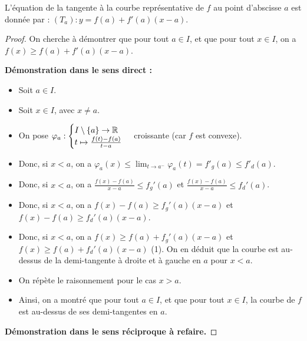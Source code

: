 \documentclass[12pt, a4paper]{report}
\begin{document}
\begin{remark}
  L'équation de la tangente à la courbe représentative de $f$ au point d'abscisse $a$ est donnée par : $(T_a):y = f(a) + f'(a)(x-a)$.
\end{remark}

\begin{proof}
  On cherche à démontrer que pour tout $a \in I$, et que pour tout $x \in I$, on a $f(x) \ge f(a) + f'(a)(x-a)$.

  \textbf{Démonstration dans le sens direct :}

  \begin{itemize}
    \item Soit $a \in I$.
    \item Soit $x \in I$, avec $x \ne a$.
    \item On pose $\varphi_a : \begin{cases} I\setminus\{a\}\to\mathbb{R} \\ t\mapsto \frac{f(t)-f(a)}{t-a} \end{cases}$ croissante (car $f$ est convexe).
    \item Donc, si $x<a$, on a $\varphi_a(x) \le \lim_{t\to a^-}\varphi_a(t) = f'_g(a) \le f'_d(a)$.
    \item Donc, si $x<a$, on a $\frac{f(x)-f(a)}{x-a} \le f_g'(a)$ et $\frac{f(x)-f(a)}{x-a} \le f_d'(a)$.
    \item Donc, si $x<a$, on a $f(x) - f(a) \ge f_g'(a)(x-a)$ et $f(x) - f(a) \ge f_d'(a)(x-a)$.
    \item Donc, si $x<a$, on a $f(x) \ge f(a) + f_g'(a)(x-a)$ et $f(x) \ge f(a) + f_d'(a)(x-a)$ (1). On en déduit que la courbe est au-dessus de la demi-tangente à droite et à gauche en $a$ pour $x<a$.
    \item On répète le raisonnement pour le cas $x>a$.
    \item Ainsi, on a montré que pour tout $a \in I$, et que pour tout $x \in I$, la courbe de $f$ est au-dessus de ses demi-tangentes en $a$.
  \end{itemize}

  \textbf{Démonstration dans le sens réciproque à refaire.}

\end{proof}
\end{document}
